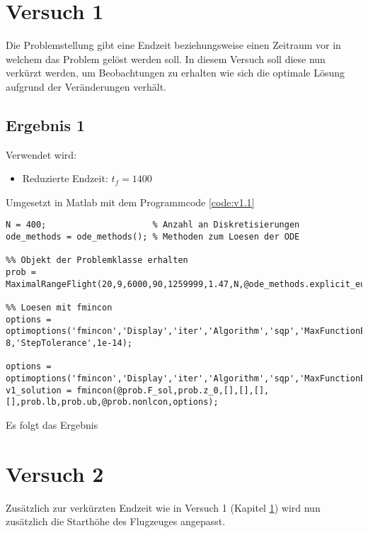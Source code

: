 \newpage
\section{Versuch 1}\label{kap:Versuch1}
Die Problemstellung gibt eine Endzeit beziehungsweise einen Zeitraum vor in welchem das Problem gelöst werden soll. In diesem Versuch soll diese nun verkürzt werden, um Beobachtungen zu erhalten wie sich die optimale Lösung aufgrund der Veränderungen verhält.

\subsection{Ergebnis 1}
Verwendet wird:
\begin{itemize}
\item Reduzierte Endzeit: $t_f = 1400$
\end{itemize}
Umgesetzt in Matlab mit dem Programmcode \ref{code:v1.1}
\begin{lstlisting}[style=num_octave, caption={Matlab Programmcode für Versuch 1.}, label=code:v1.1]
N = 400;                     % Anzahl an Diskretisierungen
ode_methods = ode_methods(); % Methoden zum Loesen der ODE

%% Objekt der Problemklasse erhalten
prob = MaximalRangeFlight(20,9,6000,90,1259999,1.47,N,@ode_methods.explicit_euler);

%% Loesen mit fmincon
options = optimoptions('fmincon','Display','iter','Algorithm','sqp','MaxFunctionEvaluations',4000.0e+03,'MaxIterations',4.0e+05,'ConstraintTolerance',1e-8,'StepTolerance',1e-14);

options = optimoptions('fmincon','Display','iter','Algorithm','sqp','MaxFunctionEvaluations',1.000e+03,'MaxIterations',4.0e+05);
v1_solution = fmincon(@prob.F_sol,prob.z_0,[],[],[],[],prob.lb,prob.ub,@prob.nonlcon,options);
\end{lstlisting}

Es folgt das Ergebnis
 








\newpage
\section{Versuch 2}
Zusätzlich zur verkürzten Endzeit wie in Versuch 1 (Kapitel \ref{kap:Versuch1}) wird nun zusätzlich die Starthöhe des Flugzeuges angepasst.

